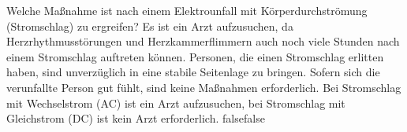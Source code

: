     {Welche Maßnahme ist nach einem Elektrounfall mit Körperdurchströmung (Stromschlag) zu ergreifen?}
    {Es ist ein Arzt aufzusuchen, da Herzrhythmusstörungen und Herzkammerflimmern auch noch viele Stunden nach einem Stromschlag auftreten können.}
    {Personen, die einen Stromschlag erlitten haben, sind unverzüglich in eine stabile Seitenlage zu bringen.}
    {Sofern sich die verunfallte Person gut fühlt, sind keine Maßnahmen erforderlich.}
    {Bei Stromschlag mit Wechselstrom (AC) ist ein Arzt aufzusuchen, bei Stromschlag mit Gleichstrom (DC) ist kein Arzt erforderlich.}
    {false}{false}